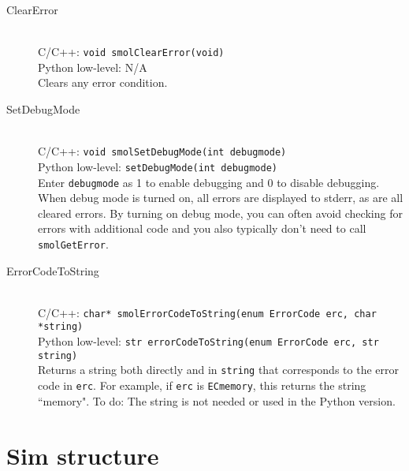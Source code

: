 \documentclass {book}
\newcommand {\ttt} {\texttt}
\begin{document}
\begin{description}
\item[ClearError]
\hfill \\
C/C++: \ttt{void smolClearError(void)}\\
Python low-level: N/A\\
Clears any error condition.

\item[SetDebugMode]
\hfill \\
C/C++: \ttt{void smolSetDebugMode(int debugmode)}\\
Python low-level: \ttt{setDebugMode(int debugmode)}\\
Enter \ttt{debugmode} as 1 to enable debugging and 0 to disable debugging. When debug mode is turned on, all errors are displayed to stderr, as are all cleared errors. By turning on debug mode, you can often avoid checking for errors with additional code and you also typically don't need to call \ttt{smolGetError}.

\item[ErrorCodeToString]
\hfill \\
C/C++: \ttt{char* smolErrorCodeToString(enum ErrorCode erc, char *string)}\\
Python low-level: \ttt{str errorCodeToString(enum ErrorCode erc, str string)}\\
Returns a string both directly and in \ttt{string} that corresponds to the error code in \ttt{erc}. For example, if \ttt{erc} is \ttt{ECmemory}, this returns the string ``memory". To do: The string is not needed or used in the Python version.

\end{description}

\section{Sim structure}
\end{document}
